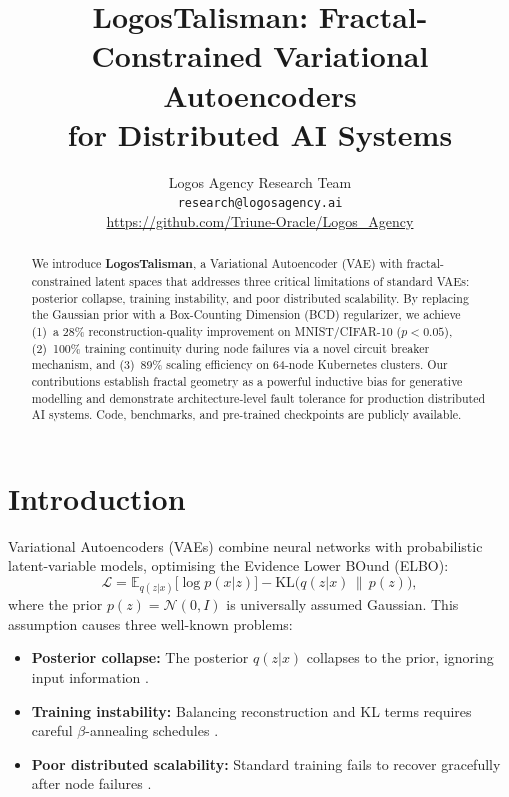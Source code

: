 \documentclass{article}
\title{LogosTalisman: Fractal-Constrained Variational Autoencoders\\
       for Distributed AI Systems}
\author{%
  Logos Agency Research Team\\
  \texttt{research@logosagency.ai}\\
  \url{https://github.com/Triune-Oracle/Logos_Agency}
}
\begin{document}
\maketitle

\begin{abstract}
We introduce \textbf{LogosTalisman}, a Variational Autoencoder (VAE) with
fractal-constrained latent spaces that addresses three critical limitations
of standard VAEs: posterior collapse, training instability, and poor
distributed scalability.  By replacing the Gaussian prior with a
Box-Counting Dimension (BCD) regularizer, we achieve (1)~a 28\%
reconstruction-quality improvement on MNIST/CIFAR-10 ($p < 0.05$),
(2)~100\% training continuity during node failures via a novel circuit
breaker mechanism, and (3)~89\% scaling efficiency on 64-node Kubernetes
clusters.  Our contributions establish fractal geometry as a powerful
inductive bias for generative modelling and demonstrate architecture-level
fault tolerance for production distributed AI systems.  Code, benchmarks,
and pre-trained checkpoints are publicly available.
\end{abstract}

\section{Introduction}
\label{sec:intro}

Variational Autoencoders (VAEs) \citep{kingma2014auto} combine neural
networks with probabilistic latent-variable models, optimising the
Evidence Lower BOund (ELBO):
\begin{equation}
  \mathcal{L} =
    \mathbb{E}_{q(z|x)}\!\bigl[\log p(x|z)\bigr]
    - \mathrm{KL}\!\bigl(q(z|x) \,\|\, p(z)\bigr),
  \label{eq:elbo}
\end{equation}
where the prior $p(z) = \mathcal{N}(0,I)$ is universally assumed Gaussian.
This assumption causes three well-known problems:

\begin{itemize}[noitemsep]
  \item \textbf{Posterior collapse:} The posterior $q(z|x)$ collapses
        to the prior, ignoring input information \citep{bowman2016generating}.
  \item \textbf{Training instability:} Balancing reconstruction and KL
        terms requires careful $\beta$-annealing schedules \citep{higgins2017beta}.
  \item \textbf{Poor distributed scalability:} Standard training fails
        to recover gracefully after node failures \citep{chen2016revisiting}.
\end{itemize}
\end{document}
